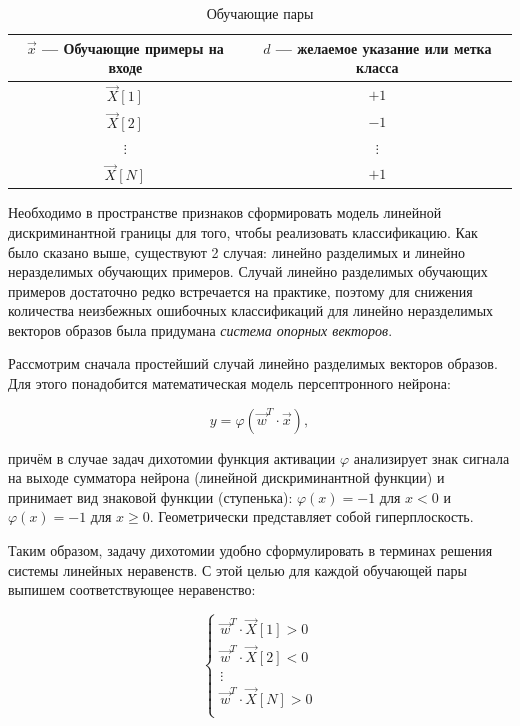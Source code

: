 \documentclass[a4paper]{article}
\numberwithin{equation}{subsection}
\begin{document}
\begin{table}[htbp]
    \centering
    \begin{tabular}{c | c}
        $\vec{x}$ --- Обучающие примеры на входе & $d$ --- желаемое указание или метка класса \\\hline
        $\vec{X}[1]$                             & $+1$ \\\hline
        $\vec{X}[2]$                             & $-1$ \\\hline
        $\vdots$                                 & $\vdots$ \\\hline
        $\vec{X}[N]$                             & $+1$ \\\hline
        
    \end{tabular}
    \caption{Обучающие пары}
    \label{table:learn_pairs}
\end{table}

Необходимо в пространстве признаков сформировать модель линейной дискриминантной
границы для того, чтобы реализовать классификацию. Как было сказано выше, существуют
2 случая: линейно разделимых и линейно неразделимых обучающих примеров.
Случай линейно разделимых обучающих примеров достаточно редко встречается
на практике, поэтому для снижения количества неизбежных ошибочных классификаций
для линейно неразделимых векторов образов была придумана \textit{система опорных векторов}.

Рассмотрим сначала простейший случай линейно разделимых векторов образов. Для этого 
понадобится математическая модель персептронного нейрона:

\begin{equation}
    y = \varphi(\vec{w}^T \cdot \vec{x}),
\end{equation}

\noindent
причём в случае задач дихотомии функция активации $\varphi$ анализирует знак сигнала 
на выходе сумматора нейрона (линейной дискриминантной функции) и принимает вид знаковой
функции (\glqq ступенька\grqq): $\varphi(x)=-1$ для $x<0$ и $\varphi(x)=-1$ для 
$x\geqslant0$. Геометрически представляет собой гиперплоскость.

Таким образом, задачу дихотомии удобно сформулировать в терминах решения системы линейных
неравенств. С этой целью для каждой обучающей пары выпишем соответствующее неравенство:

\begin{equation}
    \begin{cases}
        \vec{w}^T \cdot \vec{X}[1] > 0 \\
        \vec{w}^T \cdot \vec{X}[2] < 0 \\
        \vdots \\
        \vec{w}^T \cdot \vec{X}[N] > 0 \\
    \end{cases}
\end{equation}
\end{document}
